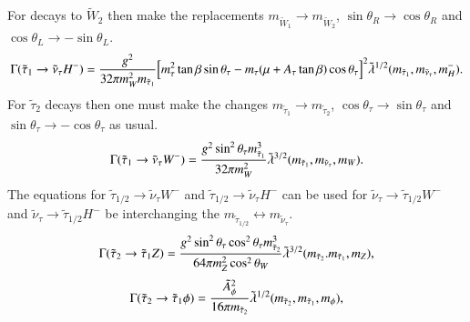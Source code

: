 \documentclass[final,3p,times]{elsarticle}
\begin{document}
For decays to $\tilde{W}_2$ then make the replacements $m_{\tilde{W}_1} \rightarrow m_{\tilde{W}_2}$, $\sin\theta_R \rightarrow \cos\theta_R$ and $\cos\theta_L \rightarrow -\sin\theta_L$.
\begin{equation}\label{stau1nutauHpm}
\begin{aligned}
\Gamma (\tilde{\tau}_1 \rightarrow \tilde{\nu}_\tau H^-) = {g^2 \over 32\pi m_W^2 m_{\tilde{\tau}_1}} \Big[m_\tau^2 \tan\beta\sin\theta_{\tau} - m_\tau (\mu + A_\tau \tan\beta) \cos\theta_{\tau}\Big]^2 \tilde{\lambda}^{1/2} (m_{\tilde{\tau}_1}, m_{\tilde{\nu}_\tau}, m_H^-).
\end{aligned}
\end{equation} 
For $\tilde{\tau}_2$ decays then one must make the changes $m_{\tilde{\tau}_1} \rightarrow m_{\tilde{\tau}_2}$, $\cos\theta_\tau \rightarrow \sin\theta_\tau$ and $\sin\theta_\tau \rightarrow -\cos\theta_\tau$ as usual.
\begin{equation}\label{stau1nutauW}
\begin{aligned}
\Gamma (\tilde{\tau}_1 \rightarrow \tilde{\nu}_\tau W^-) = {g^2 \sin^2\theta_\tau m_{\tilde{\tau}_1}^3 \over 32\pi m_W^2 } \tilde{\lambda}^{3/2} (m_{\tilde{\tau}_1}, m_{\tilde{\nu}_\tau}, m_W).
\end{aligned}
\end{equation} 
The equations for $\tilde{\tau}_{1/2} \rightarrow \tilde{\nu}_\tau W^-$ and $\tilde{\tau}_{1/2} \rightarrow \tilde{\nu}_\tau H^-$ can be used for $\tilde{\nu}_{\tau} \rightarrow \tilde{\tau}_{1/2} W^-$ and $\tilde{\nu}_{\tau} \rightarrow \tilde{\tau}_{1/2} H^-$ be interchanging the $m_{\tilde{\tau}_{1/2}} \leftrightarrow m_{\tilde{\nu}_{\tau}}$.
\begin{equation}\label{stau2stau1Z}
\begin{aligned}
\Gamma (\tilde{\tau}_2 \rightarrow \tilde{\tau}_1 Z) = {g^2 \sin^2\theta_{\tau} \cos^2 \theta_{\tau} m_{\tilde{\tau}_2}^3 \over 64\pi m_Z^2 \cos^2 \theta_W } \tilde{\lambda}^{3/2} (m_{\tilde{\tau}_2}. m_{\tilde{\tau}_1}, m_Z) ,
\end{aligned}
\end{equation} 
\begin{equation}\label{stau2stau1phi}
\begin{aligned}
\Gamma (\tilde{\tau}_2 \rightarrow \tilde{\tau}_1 \phi) = {{\tilde{A}_{\phi}}^2 \over 16 \pi m_{\tilde{\tau}_2} } \tilde{\lambda}^{1/2} (m_{\tilde{\tau}_2}, m_{\tilde{\tau}_1}, m_{\phi}) ,
\end{aligned}
\end{equation} 
\end{document}
